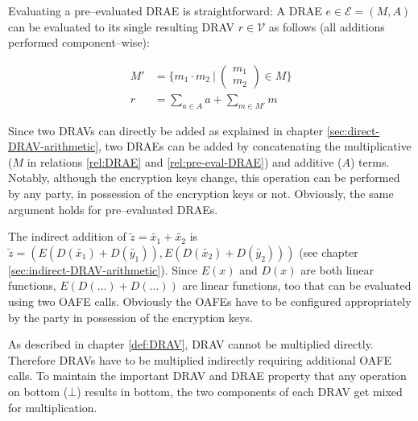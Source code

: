 Evaluating a pre--evaluated DRAE is straightforward: A DRAE $e \in \mathcal{E} =
(M,A)$ can be evaluated to its single resulting DRAV $r \in \mathcal{V}$ as
follows (all additions performed component--wise):

\begin{align*}
M' &= \Bigg\{ m_1 \cdot m_2\ \Bigg|\ \begin{pmatrix}m_1\\m_2\end{pmatrix}
\in M \Bigg\} \\
r & = \sum_{a \in A}a + \sum_{m \in M'}m
\end{align*}




Since two DRAVs can directly be added as explained in chapter
\ref{sec:direct-DRAV-arithmetic}, two DRAEs can be added by concatenating the
multiplicative ($M$ in relations \ref{rel:DRAE} and \ref{rel:pre-eval-DRAE}) and
additive ($A$) terms. Notably, although the encryption keys change, this
operation can be performed by any party, in possession of the encryption keys or
not. Obviously, the same argument holds for pre--evaluated DRAEs.



The indirect addition of $\widetilde{z} = \widetilde{x_1} + \widetilde{x_2}$ is
$\widetilde{z} =
\left( E\left(D(\widetilde{x_1}) + D(\widetilde{y_1})\right),
       E\left(D(\widetilde{x_2}) + D(\widetilde{y_2})\right)
\right)$
(see chapter \ref{sec:indirect-DRAV-arithmetic}).
Since $E(x)$ and $D(x)$ are both linear functions, $E\left(D(\ldots)
+D(\ldots)\right)$ are linear functions, too that can be evaluated using two
OAFE calls.  Obviously the OAFEs have to be configured appropriately by the
party in possession of the encryption keys.



As described in chapter \ref{def:DRAV}, DRAV cannot be multiplied directly.
Therefore DRAVs have to be multiplied indirectly requiring additional OAFE
calls. To maintain the important DRAV and DRAE property that any operation on
bottom ($\bot$) results in bottom, the two components of each DRAV get mixed for
multiplication.




